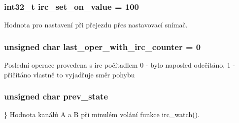 \subsubsection[{irc\_\-set\_\-on\_\-value}]{\setlength{\rightskip}{0pt plus 5cm}int32\_\-t {\bf irc\_\-set\_\-on\_\-value} = 100\hspace{0.3cm}{\ttfamily  [static]}}\label{irc2_8c_ace11bc81992ca3824a4fb55ff1d5b47b}


Hodnota pro nastavení při přejezdu přes nastavovací snímač. 
\subsubsection[{last\_\-oper\_\-with\_\-irc\_\-counter}]{\setlength{\rightskip}{0pt plus 5cm}unsigned char {\bf last\_\-oper\_\-with\_\-irc\_\-counter} = 0\hspace{0.3cm}{\ttfamily  [static]}}\label{irc2_8c_a40b68af2e4f96a1cfd2785b6d3b8aa9c}
Poslední operace provedena s irc počítadlem 0 -\/ bylo naposled odečítáno, 1 -\/ přičítáno vlastně to vyjadřuje směr pohybu 
\subsubsection[{prev\_\-state}]{\setlength{\rightskip}{0pt plus 5cm}unsigned char {\bf prev\_\-state}\hspace{0.3cm}{\ttfamily  [static]}}\label{irc2_8c_ad24a7209740a83b880691380fbe8e0e9}


\} Hodnota kanálů A a B při minulém volání funkce irc\_\-watch(). 